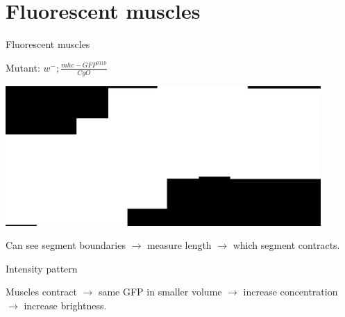 \documentclass{beamer}%
\newcommand{\citerr}[1]{\hfill {\footnotesize{\color{darkgrey}\cite{#1}}}}
\begin{document}

\section{Fluorescent muscles}


\begin{frame}{Fluorescent muscles}
%
 \begin{center}
 Mutant: $w^-; \frac{mhc-GFP^{0110}}{CyO}$ \citerr{Hughes17498969}

 \includegraphics[width=12cm]{Figs/LarvaStitchPNG.png}
 \end{center}

 \vp Can see segment boundaries $\to$ measure length $\to$ which segment contracts.
%
\end{frame}


\begin{frame}{Intensity pattern}
%
 \begin{center}
 \end{center}

 Muscles contract $\rightarrow$ same GFP in smaller volume $\rightarrow$ increase
 concentration $\rightarrow$ increase brightness.

%
\end{frame}
\end{document}
